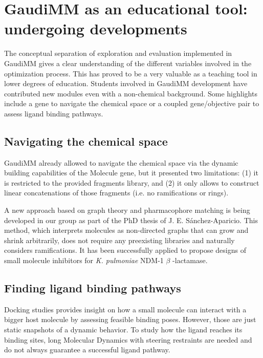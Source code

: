 \section{GaudiMM as an educational tool: undergoing developments}
The conceptual separation of exploration and evaluation implemented in GaudiMM gives a clear understanding of the different variables involved in the optimization process. This has proved to be a very valuable as a teaching tool in lower degrees of education. Students involved in GaudiMM development have contributed new modules even with a non-chemical background. Some highlights include a gene to navigate the chemical space or a coupled gene/objective pair to assess ligand binding pathways.

\subsection{Navigating the chemical space}
GaudiMM already allowed to navigate the chemical space via the dynamic building capabilities of the Molecule gene, but it presented two limitations: (1) it is restricted to the provided fragments library, and (2) it only allows to construct linear concatenations of those fragments (i.e. no ramifications or rings).

A new approach based on graph theory and pharmacophore matching is being developed in our group as part of the PhD thesis of J. E. Sánchez-Aparicio. This method, which interprets molecules as non-directed graphs that can grow and shrink arbitrarily, does not require any preexisting libraries and naturally considers ramifications. It has been successfully applied to propose designs of small molecule inhibitors for\textit{ K. pulmoniae} NDM-1 $ \beta $ -lactamase.

\subsection{Finding ligand binding pathways}
Docking studies provides insight on how a small molecule can interact with a bigger host molecule by assessing feasible binding poses. However, those are just static snapshots of a dynamic behavior. To study how the ligand reaches its binding sites, long Molecular Dynamics with steering restraints are needed and do not always guarantee a successful ligand pathway.

